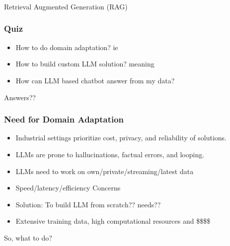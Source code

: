 \begin{frame}[fragile]\frametitle{}
\begin{center}
{\Large Retrieval Augmented Generation (RAG)}
\end{center}
\end{frame}

\begin{frame}[fragile]\frametitle{Quiz}
  \begin{itemize}
    \item How to do domain adaptation? ie
	\item How to build custom LLM solution? meaning
	\item How can LLM based chatbot answer from my data?
  \end{itemize}
  
  Answers??
  
\end{frame}

\begin{frame}[fragile]\frametitle{Need for Domain Adaptation}

\begin{itemize}
\item Industrial settings prioritize cost, privacy, and reliability of solutions.
\item LLMs are prone to hallucinations, factual errors, and looping.
\item LLMs need to work on own/private/streaming/latest data
\item Speed/latency/efficiency Concerns
\item Solution: To build LLM from scratch?? needs?? 
\item Extensive training data, high computational resources and \$\$\$\$
\end{itemize}	

So, what to do?

\end{frame}



